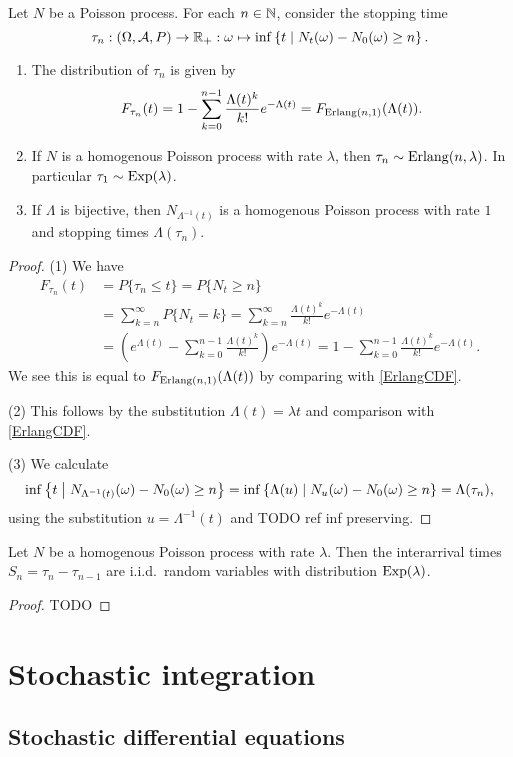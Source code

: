 \begin{proposition}
Let $N$ be a Poisson process. For each $n\in \mathbb{N}$, consider the stopping time
\[ \tau_n: \left( \Omega, \mathcal{A}, P \right) \to \mathbb{R}_+: \omega \mapsto \inf\left\{ t \;\middle|\; N_t(\omega) - N_0(\omega) \geq n  \right\}. \]
\begin{enumerate}
\item The distribution of $\tau_n$ is given by
\[ F_{\tau_n}(t) = 1- \sum_{k=0}^{n-1}\frac{\Lambda(t)^k}{k!}e^{-\Lambda(t)} = F_{\operatorname{Erlang}(n, 1)}(\Lambda(t)). \]
\item If $N$ is a homogenous Poisson process with rate $\lambda$, then $\tau_n \sim \operatorname{Erlang}(n, \lambda)$. In particular $\tau_1 \sim \operatorname{Exp}(\lambda)$.
\item If $\Lambda$ is bijective, then $N_{\Lambda^{-1}(t)}$ is a homogenous Poisson process with rate $1$ and stopping times $\Lambda(\tau_n)$.
\end{enumerate}
\end{proposition}
\begin{proof}
(1) We have
\begin{align*}
F_{\tau_n}(t) &= P\{\tau_n \leq t\} = P\{N_t \geq n\} \\
&= \sum_{k=n}^{\infty}P\{N_t = k\} = \sum_{k=n}^{\infty} \frac{\Lambda(t)^k}{k!}e^{-\Lambda(t)} \\
&= (e^{\Lambda(t)} - \sum_{k=0}^{n-1}\frac{\Lambda(t)^k}{k!})e^{-\Lambda(t)} = 1- \sum_{k=0}^{n-1}\frac{\Lambda(t)^k}{k!}e^{-\Lambda(t)}.
\end{align*}
We see this is equal to $F_{\operatorname{Erlang}(n, 1)}(\Lambda(t))$ by comparing with \ref{ErlangCDF}. 

(2) This follows by the substitution $\Lambda(t) = \lambda t$ and comparison with \ref{ErlangCDF}.

(3) We calculate
\[ \inf\left\{ t \;\middle|\; N_{\Lambda^{-1}(t)}(\omega) - N_0(\omega) \geq n  \right\} = \inf\left\{ \Lambda(u) \;\middle|\; N_{u}(\omega) - N_0(\omega) \geq n  \right\} = \Lambda(\tau_n), \]
using the substitution $u = \Lambda^{-1}(t)$ and TODO ref inf preserving.
\end{proof}

\begin{proposition}
Let $N$ be a homogenous Poisson process with rate $\lambda$. Then the interarrival times $S_n = \tau_n - \tau_{n-1}$ are i.i.d.\ random variables with distribution $\operatorname{Exp}(\lambda)$.
\end{proposition}
\begin{proof}
TODO
\end{proof}

\section{Stochastic integration}
\subsection{Stochastic differential equations}

